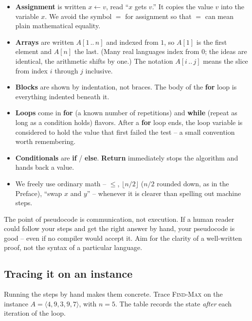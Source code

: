 \begin{itemize}
  \item \textbf{Assignment} is written $x \gets v$, read ``$x$ gets $v$.'' It
        copies the value $v$ into the variable $x$. We avoid the symbol $=$ for
        assignment so that $=$ can mean plain mathematical equality.
  \item \textbf{Arrays} are written $A[1\,..\,n]$ and indexed from $1$, so $A[1]$ is
        the first element and $A[n]$ the last. (Many real languages index from
        $0$; the ideas are identical, the arithmetic shifts by one.) The notation
        $A[i\,..\,j]$ means the slice from index $i$ through $j$ inclusive.
  \item \textbf{Blocks} are shown by indentation, not braces. The body of the
        \textbf{for} loop is everything indented beneath it.
  \item \textbf{Loops} come in \textbf{for} (a known number of repetitions) and
        \textbf{while} (repeat as long as a condition holds) flavors. After a
        \textbf{for} loop ends, the loop variable is considered to hold the value
        that first failed the test -- a small convention worth remembering.
  \item \textbf{Conditionals} are \textbf{if} / \textbf{else}. \textbf{Return}
        immediately stops the algorithm and hands back a value.
  \item We freely use ordinary math -- $\le$, $\lfloor n/2 \rfloor$ ($n/2$ rounded down, as in the Preface), ``swap $x$ and
        $y$'' -- whenever it is clearer than spelling out machine steps.
\end{itemize}

\begin{focusbox}
The point of pseudocode is communication, not execution. If a human reader could
follow your steps and get the right answer by hand, your pseudocode is good --
even if no compiler would accept it. Aim for the clarity of a well-written proof,
not the syntax of a particular language.
\end{focusbox}

\subsection{Tracing it on an instance}

Running the steps by hand makes them concrete. Trace \textsc{Find-Max}
on the instance $A = \langle 4, 9, 3, 9, 7 \rangle$, with $n = 5$. The table records
the state \emph{after} each iteration of the loop.

